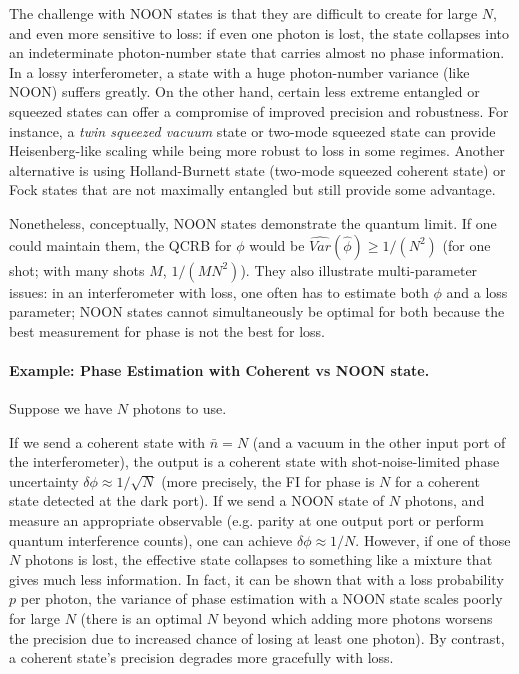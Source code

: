 The challenge with NOON states is that they are difficult to create
for large $N$, and even more sensitive to loss: if even one photon is
lost, the state collapses into an indeterminate photon-number state
that carries almost no phase information. In a lossy interferometer, a
state with a huge photon-number variance (like NOON) suffers
greatly. On the other hand, certain less extreme entangled or squeezed
states can offer a compromise of improved precision and
robustness. For instance, a \emph{twin squeezed vacuum} state or
two-mode squeezed state can provide Heisenberg-like scaling while
being more robust to loss in some regimes. Another alternative is
using Holland-Burnett state (two-mode squeezed coherent state) or Fock
states that are not maximally entangled but still provide some
advantage.



Nonetheless, conceptually, NOON states demonstrate the quantum
limit. If one could maintain them, the QCRB for $\phi$ would be
$\widehat{Var}(\hat{\phi}) \ge 1/(N^2)$ (for one shot; with many shots $M$,
$1/(M N^2)$). They also illustrate multi-parameter issues: in an
interferometer with loss, one often has to estimate both $\phi$ and a
loss parameter; NOON states cannot simultaneously be optimal for both
because the best measurement for phase is not the best for loss.



\paragraph{Example: Phase Estimation with Coherent vs NOON state.} Suppose we have $N$ photons to use.



If we send a coherent state with $\bar{n}=N$ (and a vacuum in the
other input port of the interferometer), the output is a coherent
state with shot-noise-limited phase uncertainty $\delta \phi \approx
1/\sqrt{N}$ (more precisely, the FI for phase is $N$ for a coherent
state detected at the dark port).  If we send a NOON state of $N$
photons, and measure an appropriate observable (e.g. parity at one
output port or perform quantum interference counts), one can achieve
$\delta \phi \approx 1/N$. However, if one of those $N$ photons is
lost, the effective state collapses to something like a mixture that
gives much less information. In fact, it can be shown that with a loss
probability $p$ per photon, the variance of phase estimation with a
NOON state scales poorly for large $N$ (there is an optimal $N$ beyond
which adding more photons worsens the precision due to increased
chance of losing at least one photon). By contrast, a coherent state’s
precision degrades more gracefully with loss.




